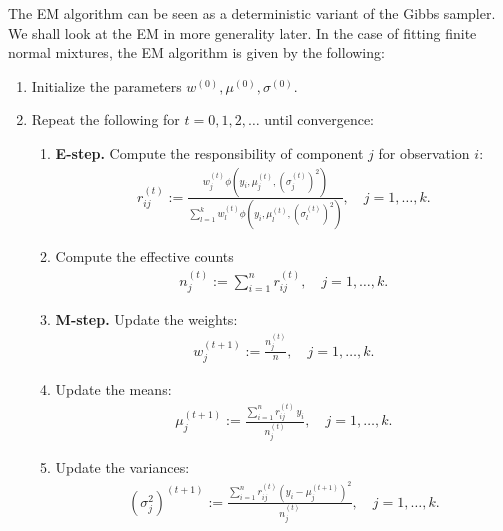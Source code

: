 \documentclass{scrartcl}
\begin{document}
The EM algorithm can be seen as a deterministic variant of the Gibbs
sampler. We shall look at the EM in more generality later. In the case
of fitting finite normal mixtures, the EM algorithm is given by the
following: 
\begin{enumerate}
\item Initialize the parameters $w^{(0)}, \mu^{(0)}, \sigma^{(0)}$.
\item Repeat the following for $t = 0, 1, 2, \dots$ until convergence:
  \begin{enumerate}
  \item \textbf{E-step.} Compute the responsibility of component $j$ for
  observation $i$:
    \begin{align*}
      r_{ij}^{(t)} := \frac{w_j^{(t)}
      \phi\left(y_i, \mu_j^{(t)}, (\sigma_j^{(t)})^2\right)}
      {\sum_{l=1}^k w_l^{(t)}
      \phi\left(y_i, \mu_l^{(t)}, (\sigma_l^{(t)})^2\right)},
      \quad j = 1, \dots, k.
    \end{align*}
  \item Compute the effective counts
    \begin{align*}
      n_j^{(t)} := \sum_{i=1}^n r_{ij}^{(t)}, \quad j = 1, \dots, k.
    \end{align*}
  \item \textbf{M-step.} Update the weights:
    \begin{align*}
      w_j^{(t+1)} := \frac{n_j^{(t)}}{n}, \quad j = 1, \dots, k.
    \end{align*}
  \item Update the means:
    \begin{align*}
      \mu_j^{(t+1)} := \frac{\sum_{i=1}^n r_{ij}^{(t)}\, y_i}{n_j^{(t)}},
      \quad j = 1, \dots, k.
    \end{align*}
  \item Update the variances:
    \begin{align*}
      (\sigma_j^2)^{(t+1)} := \frac{\sum_{i=1}^n r_{ij}^{(t)}
      \left(y_i - \mu_j^{(t+1)}\right)^2}{n_j^{(t)}},
      \quad j = 1, \dots, k.
    \end{align*}
  \end{enumerate}
\end{enumerate}
\end{document}
